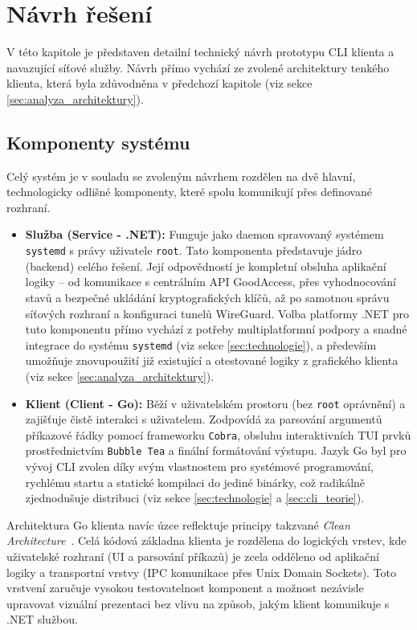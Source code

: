 \chapter{Návrh řešení}
\label{chap:navrh}

V této kapitole je představen detailní technický návrh prototypu CLI klienta a navazující síťové služby. Návrh přímo vychází ze zvolené architektury tenkého klienta, která byla zdůvodněna v předchozí kapitole (viz sekce \ref{sec:analyza_architektury}).

\section{Komponenty systému}
Celý systém je v souladu se zvoleným návrhem rozdělen na dvě hlavní, technologicky odlišné komponenty, které spolu komunikují přes definované rozhraní.

\begin{itemize}
    \item \textbf{Služba (Service - .NET):} Funguje jako daemon spravovaný systémem \texttt{systemd} s právy uživatele \texttt{root}. Tato komponenta představuje jádro (backend) celého řešení. Její odpovědností je kompletní obsluha aplikační logiky – od komunikace s centrálním API GoodAccess, přes vyhodnocování stavů a bezpečné ukládání kryptografických klíčů, až po samotnou správu síťových rozhraní a konfiguraci tunelů WireGuard. Volba platformy .NET pro tuto komponentu přímo vychází z potřeby multiplatformní podpory a snadné integrace do systému \texttt{systemd} (viz sekce \ref{sec:technologie}), a především umožňuje znovupoužití již existující a otestované logiky z grafického klienta (viz sekce \ref{sec:analyza_architektury}).
    \item \textbf{Klient (Client - Go):} Běží v uživatelském prostoru (bez \texttt{root} oprávnění) a zajišťuje čistě interakci s uživatelem. Zodpovídá za parsování argumentů příkazové řádky pomocí frameworku \texttt{Cobra}, obsluhu interaktivních TUI prvků prostřednictvím \texttt{Bubble Tea} a finální formátování výstupu. Jazyk Go byl pro vývoj CLI zvolen díky svým vlastnostem pro systémové programování, rychlému startu a statické kompilaci do jediné binárky, což radikálně zjednodušuje distribuci (viz sekce \ref{sec:technologie} a \ref{sec:cli_teorie}).
\end{itemize}

Architektura Go klienta navíc úzce reflektuje principy takzvané \textit{Clean Architecture}~\cite{martin_clean}. Celá kódová základna klienta je rozdělena do logických vrstev, kde uživatelské rozhraní (UI a parsování příkazů) je zcela odděleno od aplikační logiky a transportní vrstvy (IPC komunikace přes Unix Domain Sockets). Toto vrstvení zaručuje vysokou testovatelnost komponent a možnost nezávisle upravovat vizuální prezentaci bez vlivu na způsob, jakým klient komunikuje s .NET službou.


